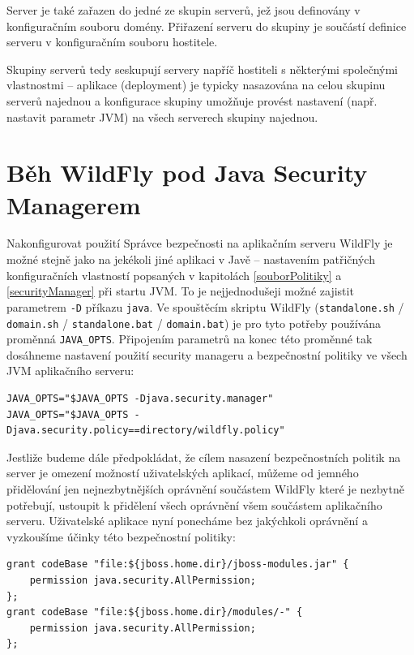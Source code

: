 Server je také zařazen do jedné ze skupin serverů, jež jsou definovány v konfiguračním souboru domény. Přiřazení serveru do skupiny je součástí definice serveru v konfiguračním souboru hostitele. \cite{jbossDomainSetup}

Skupiny serverů tedy seskupují servery napříč hostiteli s některými společnými vlastnostmi -- aplikace (deployment) je typicky nasazována na celou skupinu serverů najednou a konfigurace skupiny umožňuje provést nastavení (např. nastavit parametr JVM) na všech serverech skupiny najednou. \cite{jbossDomainSetup}

\section{Běh WildFly pod Java Security Managerem}

Nakonfigurovat použití Správce bezpečnosti na aplikačním serveru WildFly je možné stejně jako na jekékoli jiné aplikaci v Javě -- nastavením patřičných konfiguračních vlastností popsaných v kapitolách \ref{souborPolitiky} a \ref{securityManager} při startu JVM. To je nejjednodušeji možné zajistit parametrem {\tt -D} příkazu {\tt java}. Ve spouštěcím skriptu WildFly ({\tt standalone.sh} / {\tt domain.sh} / {\tt standalone.bat} / {\tt domain.bat}) je pro tyto potřeby používána proměnná {\tt JAVA\_OPTS}. Připojením parametrů na konec této proměnné tak dosáhneme nastavení použití security manageru a bezpečnostní politiky ve všech JVM aplikačního serveru: \cite{jbossSecurityManager}

\begin{verbatim}
JAVA_OPTS="$JAVA_OPTS -Djava.security.manager"
JAVA_OPTS="$JAVA_OPTS -Djava.security.policy==directory/wildfly.policy"
\end{verbatim}

Jestliže budeme dále předpokládat, že cílem nasazení bezpečnostních politik na server je omezení možností uživatelských aplikací, můžeme od jemného přidělování jen nejnezbytnějších oprávnění součástem WildFly které je nezbytně potřebují, ustoupit k přidělení všech oprávnění všem součástem aplikačního serveru. Uživatelské aplikace nyní ponecháme bez jakýchkoli oprávnění a vyzkoušíme účinky této bezpečnostní politiky:

\begin{verbatim}
grant codeBase "file:${jboss.home.dir}/jboss-modules.jar" {
    permission java.security.AllPermission;
};
grant codeBase "file:${jboss.home.dir}/modules/-" {
    permission java.security.AllPermission;
};
\end{verbatim}

